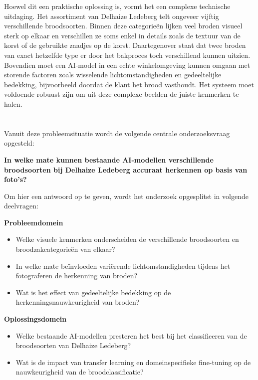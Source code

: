 Hoewel dit een praktische oplossing is, vormt het een complexe technische uitdaging. Het assortiment van Delhaize Ledeberg telt ongeveer vijftig verschillende broodsoorten. Binnen deze categorieën lijken veel broden visueel sterk op elkaar en verschillen ze soms enkel in details zoals de textuur van de korst of de gebruikte zaadjes op de korst. Daartegenover staat dat twee broden van exact hetzelfde type er door het bakproces toch verschillend kunnen uitzien. Bovendien moet een AI-model in een echte winkelomgeving kunnen omgaan met storende factoren zoals wisselende lichtomstandigheden en gedeeltelijke bedekking, bijvoorbeeld doordat de klant het brood vasthoudt. Het systeem moet voldoende robuust zijn om uit deze complexe beelden de juiste kenmerken te halen.

\section{}%
\label{sec:onderzoeksvraag}

Vanuit deze probleemsituatie wordt de volgende centrale onderzoeksvraag opgesteld:

\textbf{In welke mate kunnen bestaande AI-modellen verschillende broodsoorten bij Delhaize Ledeberg accuraat herkennen op basis van foto's?}

Om hier een antwoord op te geven, wordt het onderzoek opgesplitst in volgende deelvragen:

\textbf{Probleemdomein}
\begin{itemize}
    \item Welke visuele kenmerken onderscheiden de verschillende broodsoorten en broodzakcategorieën van elkaar?
    \item In welke mate beïnvloeden variërende lichtomstandigheden tijdens het fotograferen de herkenning van broden?
    \item Wat is het effect van gedeeltelijke bedekking op de herkenningsnauwkeurigheid van broden?
\end{itemize}

\textbf{Oplossingsdomein}
\begin{itemize}
    \item Welke bestaande AI-modellen presteren het best bij het classificeren van de broodsoorten van Delhaize Ledeberg?
    \item Wat is de impact van transfer learning en domeinspecifieke fine-tuning op de nauwkeurigheid van de broodclassificatie?
\end{itemize}

